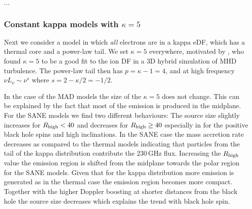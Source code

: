 
...




\subsubsection{Constant kappa models with $\kappa=5$}

Next we consider a model in which {\em all} electrons are in a kappa eDF, which has a thermal core and a power-law tail.  We set $\kappa = 5$ everywhere,  motivated by \cite{2016PhRvL.117w5101K}, who found $\kappa = 5$ to be a good fit to the ion DF in a 3D hybrid simulation of MHD turbulence.  The power-law tail then has $p = \kappa - 1 = 4$, and at high frequency $\nu L_\nu \sim \nu^s$ where $s = 2 - \kappa/2 = -1/2$.


In the case of the MAD models the size of the $\kappa=5$ does not change. This can be explained by the fact that most of the emission is produced in the midplane. For the SANE models we find two different behaviours: The source size slightly increases for $R_{\rm high}<40$ and decreases for $R_{\rm high}\geq 40$ especially in for the positive black hole spins and high inclinations. In the SANE case the mass accretion rate decreases as compared to the thermal models indicating that particles from the tail of the kappa distribution contribute the 230\,GHz flux. Increasing the $R_{\rm high}$ value the emission region is shifted from the midplane towards the polar region for the SANE models. Given that for the kappa distribution more emission is generated as in the thermal case the emission region becomes more compact. Together with the higher Doppler boosting at shorter distances from the black hole the source size decreases which explains the trend with black hole spin.

